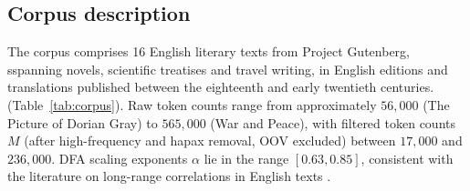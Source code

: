 \documentclass[preprint]{elsarticle}
\begin{document}
\subsection{Corpus description}
\label{sec:corpus_texts}

The corpus comprises 16 English literary texts from Project Gutenberg,
sspanning novels, scientific treatises and travel writing, in English editions 
and translations published between the eighteenth and early twentieth centuries.
(Table~\ref{tab:corpus}).
Raw token counts range from approximately $56{,}000$ (The Picture of
Dorian Gray) to $565{,}000$ (War and Peace), with filtered token counts
$M$ (after high-frequency and hapax removal, OOV excluded) between
$17{,}000$ and $236{,}000$.
DFA scaling exponents $\alpha$ lie in the range $[0.63, 0.85]$,
consistent with the literature on long-range correlations in English
texts \citep{Ebeling1995, MontemurroPury2002}.
\end{document}
